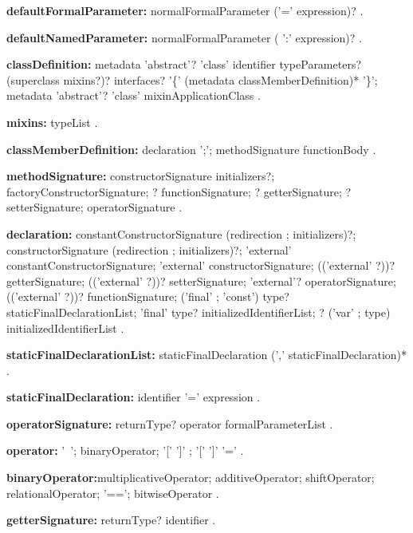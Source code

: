 \begin{grammar}
{\bf defaultFormalParameter:}
    normalFormalParameter ('=' expression)?
    .   
        
{\bf defaultNamedParameter:}
    normalFormalParameter ( ':' expression)?
    .   
\end{grammar}
\begin{grammar}
{\bf classDefinition:}
    metadata 'abstract'?  'class' identifier typeParameters? (superclass mixins?)? interfaces?
    '\{' (metadata classMemberDefinition)* '\}';
    metadata 'abstract'?  'class' mixinApplicationClass
    .
    
{\bf mixins:}
    \WITH{} typeList
    .

{\bf classMemberDefinition:}
    declaration ';';
    methodSignature functionBody
    .

{\bf methodSignature:}
    constructorSignature initializers?;
    factoryConstructorSignature;
    \STATIC{}? functionSignature;
    \STATIC{}? getterSignature;
    \STATIC{}? setterSignature;
    operatorSignature
    .

{\bf declaration:}
    constantConstructorSignature (redirection ; initializers)?;
    constructorSignature (redirection ; initializers)?;
    'external' constantConstructorSignature;
    'external' constructorSignature;
    (('external' \STATIC{} ?))? getterSignature;
    (('external' \STATIC{}?))? setterSignature;
    'external'? operatorSignature;
     (('external' \STATIC{}?))? functionSignature;
    \STATIC{} ('final' ; 'const') type? staticFinalDeclarationList;
    'final' type? initializedIdentifierList;
    \STATIC{}? ('var' ; type) initializedIdentifierList
    .

{\bf staticFinalDeclarationList:}
    staticFinalDeclaration (',' staticFinalDeclaration)*
    .

{\bf staticFinalDeclaration:}
    identifier '=' expression
    .
\end{grammar}
\begin{grammar}
{\bf operatorSignature:}
    returnType? \OPERATOR{} operator formalParameterList
    .
       
{\bf operator:}
    '~';
    binaryOperator;
    '[' ']' ;
    '[' ']' '='
    .

{\bf binaryOperator:}multiplicativeOperator;
    additiveOperator;
    shiftOperator;
    relationalOperator;
    '==';
    bitwiseOperator
    .
\end{grammar}
\begin{grammar}
{\bf getterSignature:}
    returnType? \GET{} identifier 
    .
\end{grammar}
